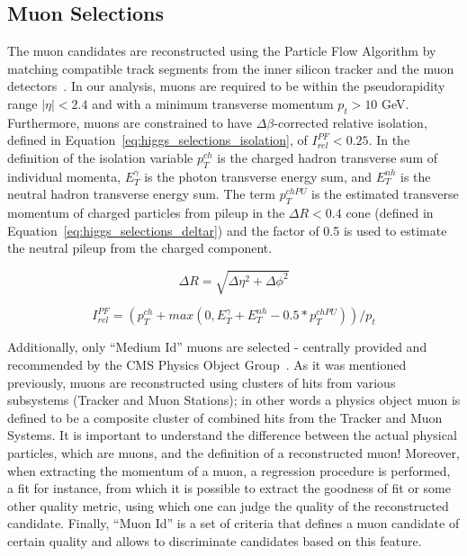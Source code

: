\subsection{Muon Selections}
The muon candidates are reconstructed using the Particle Flow Algorithm by matching compatible track segments from the inner silicon tracker and the muon detectors~\cite{Chatrchyan:2012xi}. In our analysis, muons are required to be  within the pseudorapidity range $|\eta|<2.4$ and with a minimum transverse momentum $p_{t}>10$ GeV. Furthermore, muons are constrained to have $\Delta \beta$-corrected relative isolation, defined in Equation~\ref{eq:higgs_selections_isolation}, of $I_{rel}^{PF}<0.25$. In the definition of the isolation variable $p_{T}^{ch}$ is the charged hadron transverse sum of individual momenta, $E_{T}^{\gamma}$ is the photon transverse energy sum, and $E_{T}^{nh}$ is the neutral hadron transverse energy sum. The term $p_{T}^{chPU}$ is the estimated transverse momentum of charged particles from pileup in the $\Delta R < 0.4$ cone (defined in Equation~\ref{eq:higgs_selections_deltar}) and the factor of 0.5 is used to estimate the neutral pileup from the charged component.
\begin{center}
   \begin{equation}
      \label{eq:higgs_selections_deltar}
      {\Delta R} = {\sqrt{\Delta\eta^{2}+\Delta\phi^{2}}}
   \end{equation}
\end{center}
\begin{center}
   \begin{equation}
      \label{eq:higgs_selections_isolation}
      {I_{rel}^{PF}} = {(p_{T}^{ch}+max(0,E_{T}^{\gamma}+E_{T}^{nh}-0.5*p_{T}^{chPU}))/p_{t}}
   \end{equation}
\end{center}

Additionally, only ``Medium Id'' muons are selected - centrally provided and recommended by the CMS Physics Object Group~\cite{CMSMuonPOG,CMSMuonId}. As it was mentioned previously, muons are reconstructed using clusters of hits from various subsystems (Tracker and Muon Stations); in other words a physics object muon is defined to be a composite cluster of combined hits from the Tracker and Muon Systems. It is important to understand the difference between the actual physical particles, which are muons, and the definition of a reconstructed muon! Moreover, when extracting the momentum of a muon, a regression procedure is performed, a fit for instance, from which it is possible to extract the goodness of fit or some other quality metric, using which one can judge the quality of the reconstructed candidate. Finally, ``Muon Id'' is a set of criteria that defines a muon candidate of certain quality and allows to discriminate candidates based on this feature.

